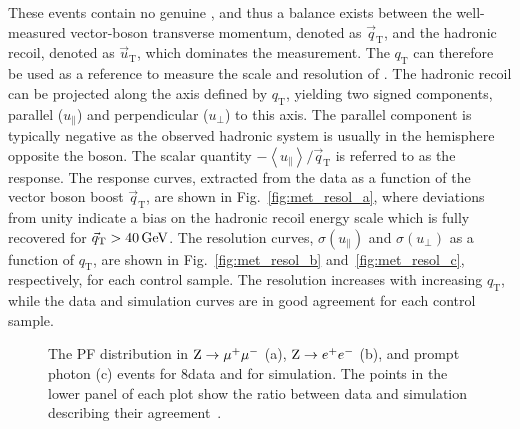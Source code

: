 These events contain no genuine \ptvecmiss, and thus a balance exists between the well-measured vector-boson transverse momentum, denoted as ${\vec q}_\mathrm{T}$, and the hadronic recoil, denoted as ${\vec u}_\mathrm{T}$,  which dominates the \ptvecmiss measurement. The $q_\mathrm{T}$ can therefore be used as a reference to measure the scale and resolution of \ptvecmiss.
The hadronic recoil can be projected along the axis defined by $q_\mathrm{T}$, yielding two signed components, parallel ($u_\parallel$) and perpendicular ($u_\perp$) to this axis. The parallel component is typically negative as the observed hadronic system is usually in the hemisphere opposite the boson. The scalar quantity $-\left\langle u_\parallel\right\rangle/{\vec q}_\mathrm{T}$ is referred to as the \ptvecmiss response. The response curves, extracted from the data as a function of the vector boson boost ${\vec q}_\mathrm{T}$, are shown in Fig.~\ref{fig:met_resol_a}, where deviations from unity indicate a bias on the hadronic recoil energy scale which is  fully recovered for ${\vec q}_\mathrm{T} > 40\,\text{Ge\hspace{-.08em}V}$.
The resolution curves, $\sigma(u_\parallel)$ and $\sigma(u_\perp)$ as a function of $q_\mathrm{T}$, are shown in Fig.~\ref{fig:met_resol_b} and~\ref{fig:met_resol_c}, respectively, for each control sample. The resolution increases with increasing $q_\mathrm{T}$, while the data and simulation curves are in good agreement for each control sample.\\

\begin{figure}[!htb]
\begin{center}
\end{center} 
\caption{The PF \ETmiss distribution in $\mathrm{Z}\to\mu^+\mu^-$ (a), $\mathrm{Z}\to e^+e^-$ (b), and prompt photon (c) events for 8\TeV data and for simulation. The points in the lower panel of each plot show the ratio between data and simulation describing their agreement~\cite{Khachatryan:2014gga}.}
\label{fig:met_distr}
\end{figure}

